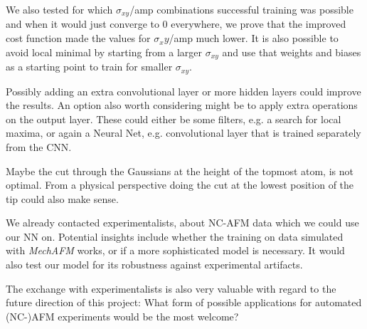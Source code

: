 \documentclass{article}
\begin{document}
We also tested for which $\sigma_{xy}$/amp combinations successful training was possible and when it would just converge to 0 everywhere, we prove that the improved cost function made the values for $\sigma_xy$/amp much lower. It is also possible to avoid local minimal by starting from a larger $\sigma_{xy}$ and use that weights and biases as a starting point to train for smaller $\sigma_{xy}$.


Possibly adding an extra convolutional layer or more hidden layers could improve the results. An option also worth considering might be to apply extra operations on the output layer. These could either be some filters, e.g. a search for local maxima, or again a Neural Net, e.g. convolutional layer that is trained separately from the CNN.

Maybe the cut through the Gaussians at the height of the topmost atom, is not optimal. From a physical perspective doing the cut at the lowest position of the tip could also make sense.

We already contacted experimentalists, about NC-AFM data which we could use our NN on. Potential insights include whether the training on data simulated with \emph{MechAFM} works, or if a more sophisticated model is necessary. It would also test our model for its robustness against experimental artifacts.

The exchange with experimentalists is also very valuable with regard to the future direction of this project: What form of possible applications for automated (NC-)AFM experiments would be the most welcome?




\newpage


\end{document}
